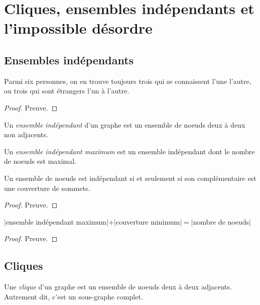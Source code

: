 \section{Cliques, ensembles indépendants et l'impossible désordre}
\subsection{Ensembles indépendants}
\begin{mytheo} 
  Parmi six personnes, on en trouve toujours trois qui se connaissent l’une l’autre, ou trois qui sont étrangers l’un à l’autre.
  \begin{proof}
     Preuve.
  \end{proof}
\end{mytheo}

\begin{mydef}
  Un \emph{ensemble indépendant} d’un graphe est un ensemble de noeuds deux à deux non adjacents.
\end{mydef}

\begin{mydef}
  Un \emph{ensemble indépendant maximum} est un ensemble indépendant dont le nombre de noeuds est maximal.
\end{mydef}

\begin{mytheo}
  Un ensemble de noeuds est indépendant si et seulement si son complémentaire est une couverture de sommets.
  \begin{proof}
     Preuve.
  \end{proof}
\end{mytheo}

\begin{mycorr}
  $|$ensemble indépendant maximum$| + |$couverture minimum$| =
|$nombre de noeuds$|$
  \begin{proof}
     Preuve.
  \end{proof}
\end{mycorr}

\subsection{Cliques}
\begin{mydef}
  Une \emph{clique} d’un graphe est un ensemble de noeuds deux à deux adjacents. Autrement dit, c’est un sous-graphe complet.
\end{mydef}

